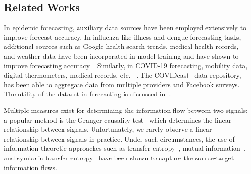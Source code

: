 \documentclass[conference,compsoc]{IEEEtran}
\newcommand{\hub}{\emph{The Hub}}
\begin{document}

\subsection{Related Works}
In epidemic forecasting, auxiliary data sources have been employed extensively to improve forecast accuracy. 
In influenza-like illness and dengue forecasting tasks, additional sources such as Google health search trends, medical health records, and weather data have been incorporated in model training and have shown to improve forecasting accuracy~\cite{yang2015accurate, prashant2019PLOSCompBio,shaman2012forecasting}. Similarly, in COVID-19 forecasting, mobility data, digital thermometers, medical records, etc. ~\cite{kapoor2020examining,wang2020using,fritz2021combining,rodriguez2020deepcovid}. 
The COVIDcast~\cite{reinhart2021open} data repository, has been able to aggregate data from multiple providers and Facebook surveys. The utility of the dataset in forecasting is discussed in~\cite{mcdonald2021can}.  

Multiple measures exist for determining the information flow between two signals; a popular method is the Granger causality test~\cite{granger1969investigating} which determines the linear relationship between signals. Unfortunately, we rarely observe a linear relationship between signals in practice. Under such circumstances, the use of information-theoretic approaches such as transfer entropy~\cite{schreiber2000measuring}, mutual information~\cite{dionisio2004mutual}, and symbolic transfer entropy~\cite{staniek2008symbolic} have been shown to capture the source-target information flows.
\end{document}
